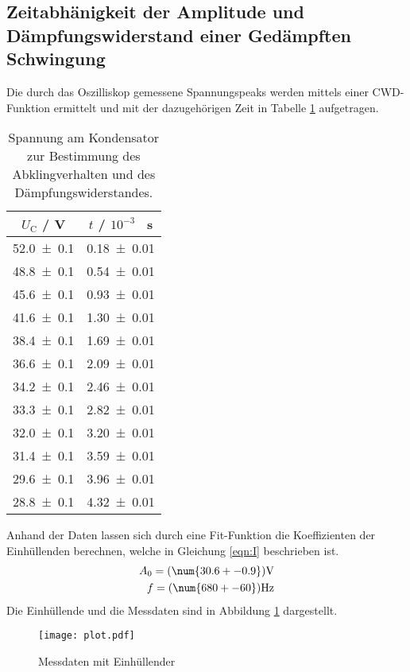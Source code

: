 \subsection{Zeitabhänigkeit der Amplitude und Dämpfungswiderstand einer Gedämpften Schwingung}
Die durch das Oszilliskop gemessene Spannungspeaks werden mittels einer CWD-Funktion ermittelt und mit der dazugehörigen Zeit in Tabelle \ref{tab:U_C} aufgetragen.
\begin{table}
  \centering
  \begin{tabular}{c c}
    \toprule
    	$U_\text{C}$ / V & $t$ / $10^{-3}$ \, s\\
    \midrule
    \num{52.0 +- 0.1}  	& \num{0.18 +- 0.01}	\\
    \num{48.8 +- 0.1}	& \num{0.54 +- 0.01}	\\
    \num{45.6 +- 0.1}	& \num{0.93 +- 0.01} 	\\
    \num{41.6 +- 0.1}	& \num{1.30 +- 0.01}	\\
    \num{38.4 +- 0.1}	& \num{1.69 +- 0.01}	\\
    \num{36.6 +- 0.1}	& \num{2.09 +- 0.01} 	\\
    \num{34.2 +- 0.1}	& \num{2.46 +- 0.01}	\\
    \num{33.3 +- 0.1} 	& \num{2.82 +- 0.01}	\\
    \num{32.0 +- 0.1} 	& \num{3.20 +- 0.01} 	\\
    \num{31.4 +- 0.1}	& \num{3.59 +- 0.01}	\\
    \num{29.6 +- 0.1}	& \num{3.96 +- 0.01}	\\
    \num{28.8 +- 0.1}	& \num{4.32 +- 0.01} 	\\
    \bottomrule
  \end{tabular}
  \caption{Spannung am Kondensator zur Bestimmung des Abklingverhalten und des Dämpfungswiderstandes.}
  \label{tab:U_C}
\end{table}
Anhand der Daten lassen sich durch eine Fit-Funktion die Koeffizienten der Einhüllenden berechnen, welche in Gleichung \ref{eqn:I} beschrieben ist.
\begin{eqnarray}
  A_0 = ( \num{30.6 +- 0.9} ) \text{V} \\
  f = ( \num{680 +- 60} ) \text{Hz}
  \label{eqn:Koef}
\end{eqnarray}
Die Einhüllende und die Messdaten sind in Abbildung \ref{fig:Osz} dargestellt.
\begin{figure}
  \centering
  \texttt{[image: plot.pdf]}
  \caption{Messdaten mit Einhüllender}
  \label{fig:Osz}
\end{figure}
